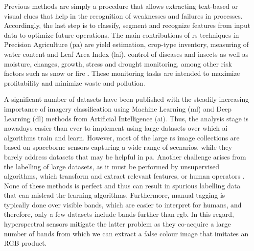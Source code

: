 Previous methods are simply a procedure that allows extracting text-based or visual clues that help in the recognition of weaknesses and failures in processes. Accordingly, the last step is to classify, segment and recognize features from input data to optimize future operations. The main contributions of \acrshort{rs} techniques in Precision Agriculture (\acrshort{pa}) are yield estimation, crop-type inventory, measuring of water content and Leaf Area Index (\acrshort{lai}), control of diseases and insects as well as moisture, changes, growth, stress and drought monitoring, among other risk factors such as snow or fire \cite{huang_agricultural_2018}. These monitoring tasks are intended to maximize profitability and minimize waste and pollution. 

A significant number of datasets have been published with the steadily increasing importance of imagery classification using Machine Learning (\acrshort{ml}) and Deep Learning (\acrshort{dl}) methods from Artificial Intelligence (\acrshort{ai}). Thus, the analysis stage is nowadays easier than ever to implement using large datasets over which \acrshort{ai} algorithms train and learn. However, most of the large \acrshort{rs} image collections are based on spaceborne sensors capturing a wide range of scenarios, while they barely address datasets that may be helpful in \acrshort{pa}. Another challenge arises from the labelling of large datasets, as it must be performed by unsupervised algorithms, which transform and extract relevant features, or human operators \cite{li_image_2021, basu_deepsat_2015}. None of these methods is perfect and thus can result in spurious labelling data that can mislead the learning algorithms. Furthermore, manual tagging is typically done over visible bands, which are easier to interpret for humans, and therefore, only a few datasets include bands further than \acrshort{rgb}. In this regard, hyperspectral sensors mitigate the latter problem as they co-acquire a large number of bands from which we can extract a false colour image that imitates an RGB product.

